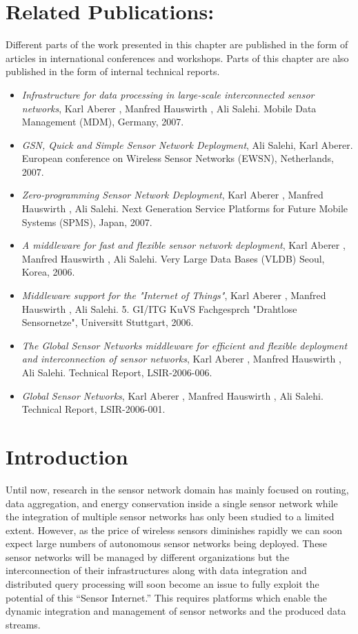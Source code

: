 \section*{Related Publications:}
Different parts of the work presented in this chapter are published in the form of articles in international conferences and workshops.
Parts of this chapter are also published in the form of internal technical reports.
\begin{itemize}
\item \emph{Infrastructure for data processing in large-scale interconnected sensor networks}, Karl Aberer , Manfred Hauswirth , Ali Salehi. Mobile Data Management (MDM), Germany, 2007.
\item \emph{GSN, Quick and Simple Sensor Network Deployment}, Ali Salehi, Karl Aberer. European conference on Wireless Sensor Networks (EWSN), Netherlands, 2007.
\item \emph{Zero-programming Sensor Network Deployment}, Karl Aberer , Manfred Hauswirth , Ali Salehi. Next Generation Service Platforms for Future Mobile Systems (SPMS), Japan, 2007.
\item \emph{A middleware for fast and flexible sensor network deployment}, Karl Aberer , Manfred Hauswirth , Ali Salehi. Very Large Data Bases (VLDB) Seoul, Korea, 2006.
\item \emph{Middleware support for the "Internet of Things"}, Karl Aberer , Manfred Hauswirth , Ali Salehi. 5. GI/ITG KuVS Fachgesprch "Drahtlose Sensornetze", Universitt Stuttgart, 2006.
\item \emph{The Global Sensor Networks middleware for efficient and flexible deployment and interconnection of sensor networks}, Karl Aberer , Manfred Hauswirth , Ali Salehi.
Technical Report, LSIR-2006-006.
\item \emph{Global Sensor Networks}, Karl Aberer , Manfred Hauswirth , Ali Salehi. Technical Report, LSIR-2006-001.
\end{itemize}
\newpage
\section{Introduction}
\label{sec:introduction}

Until now, research in the sensor network domain has mainly focused on
routing, data aggregation, and energy conservation inside a single
sensor network while the integration of multiple sensor networks has
only been studied to a limited extent. However, as the price of
wireless sensors diminishes rapidly we can soon expect large numbers
of autonomous sensor networks being deployed. These sensor networks
will be managed by different organizations but the interconnection of
their infrastructures along with data integration and distributed
query processing will soon become an issue to fully exploit the
potential of this ``Sensor Internet.'' This requires platforms which
enable the dynamic integration and management of sensor networks and
the produced data streams.

